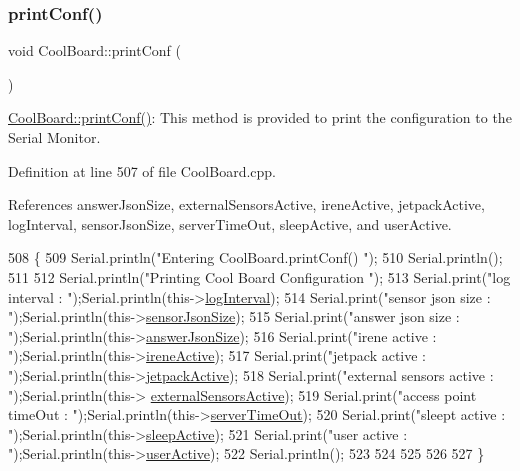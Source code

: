\subsubsection{\texorpdfstring{print\+Conf()}{printConf()}}
{\footnotesize\ttfamily void Cool\+Board\+::print\+Conf (\begin{DoxyParamCaption}{ }\end{DoxyParamCaption})}

\hyperlink{classCoolBoard_a486507b8f0981d3cc671ed31c2145755}{Cool\+Board\+::print\+Conf()}\+: This method is provided to print the configuration to the Serial Monitor. 

Definition at line 507 of file Cool\+Board.\+cpp.



References answer\+Json\+Size, external\+Sensors\+Active, irene\+Active, jetpack\+Active, log\+Interval, sensor\+Json\+Size, server\+Time\+Out, sleep\+Active, and user\+Active.


\begin{DoxyCode}
508 \{
509     Serial.println(\textcolor{stringliteral}{"Entering CoolBoard.printConf() "});
510     Serial.println();
511 
512     Serial.println(\textcolor{stringliteral}{"Printing Cool Board Configuration "});
513     Serial.print(\textcolor{stringliteral}{"log interval      : "});Serial.println(this->\hyperlink{classCoolBoard_a4de0096d575d66b472c4c1f0111fd452}{logInterval});
514     Serial.print(\textcolor{stringliteral}{"sensor json size      : "});Serial.println(this->\hyperlink{classCoolBoard_a58e4b6072e3ac8b141ec0befb479208e}{sensorJsonSize});
515     Serial.print(\textcolor{stringliteral}{"answer json size      : "});Serial.println(this->\hyperlink{classCoolBoard_af2da1f85315b3d074a8b87d158094fb7}{answerJsonSize});
516     Serial.print(\textcolor{stringliteral}{"irene active      : "});Serial.println(this->\hyperlink{classCoolBoard_a9c3f7ac625481ee2ae802a25d97a4ae0}{ireneActive});
517     Serial.print(\textcolor{stringliteral}{"jetpack active        : "});Serial.println(this->\hyperlink{classCoolBoard_a9be03a913d26e558328935ca3b59a75e}{jetpackActive});
518     Serial.print(\textcolor{stringliteral}{"external sensors active   : "});Serial.println(this->
      \hyperlink{classCoolBoard_a638b00b76aeb819ecfd4c10b8cdd7bb7}{externalSensorsActive});
519     Serial.print(\textcolor{stringliteral}{"access point timeOut  : "});Serial.println(this->\hyperlink{classCoolBoard_a7a8d8d3d316220cdd049cd63c1aa8fe6}{serverTimeOut});
520     Serial.print(\textcolor{stringliteral}{"sleept active         : "});Serial.println(this->\hyperlink{classCoolBoard_a0a51b2287139f66c738101fb53139230}{sleepActive});
521     Serial.print(\textcolor{stringliteral}{"user active       : "});Serial.println(this->\hyperlink{classCoolBoard_a6395459131d6889a3005f79c7a35e964}{userActive});
522     Serial.println();
523 
524 
525 
526 
527 \}
\end{DoxyCode}
\mbox{\label{classCoolBoard_ad03abdce2e65f520bbf2cff0f2d083cf}} 

